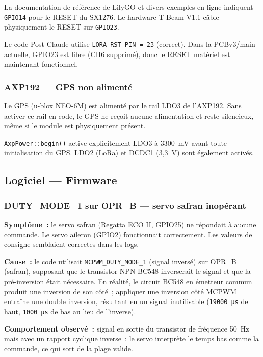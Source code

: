 \documentclass[12pt,a4paper]{article}
\newcommand{\gpio}[1]{\texttt{GPIO#1}}
\newcommand{\us}[1]{\texttt{#1\,µs}}
\begin{document}
\begin{warningbox}
  La documentation de référence de LilyGO et divers exemples en ligne
  indiquent \gpio{14} pour le RESET du SX1276. Le hardware T-Beam V1.1
  câble physiquement le RESET sur \gpio{23}.
\end{warningbox}

\begin{okbox}
  Le code Post-Claude utilise \texttt{LORA\_RST\_PIN = 23} (correct).
  Dans la PCBv3/main actuelle, GPIO23 est libre (CH6 supprimé), donc le
  RESET matériel est maintenant fonctionnel.
\end{okbox}

\subsubsection{AXP192 — GPS non alimenté}

\begin{warningbox}
  Le GPS (u-blox NEO-6M) est alimenté par le rail LDO3 de l'AXP192.
  Sans activer ce rail en code, le GPS ne reçoit aucune alimentation et
  reste silencieux, même si le module est physiquement présent.
\end{warningbox}

\begin{okbox}
  \texttt{AxpPower::begin()} active explicitement LDO3 à 3300~mV avant
  toute initialisation du GPS. LDO2 (LoRa) et DCDC1 (3,3~V) sont
  également activés.
\end{okbox}

\subsection{Logiciel — Firmware}

\subsubsection{DUTY\_MODE\_1 sur OPR\_B — servo safran inopérant}

\begin{warningbox}
  \textbf{Symptôme~:} le servo safran (Regatta ECO II, GPIO25) ne répondait
  à aucune commande. Le servo aileron (GPIO2) fonctionnait correctement.
  Les valeurs de consigne semblaient correctes dans les logs.

  \textbf{Cause~:} le code utilisait \texttt{MCPWM\_DUTY\_MODE\_1} (signal
  inversé) sur OPR\_B (safran), supposant que le transistor NPN BC548
  inverserait le signal et que la pré-inversion était nécessaire.
  En réalité, le circuit BC548 en émetteur commun produit une inversion
  de son côté~; appliquer une inversion côté MCPWM entraîne une double
  inversion, résultant en un signal inutilisable (\us{19000} de haut,
  \us{1000} de bas au lieu de l'inverse).

  \textbf{Comportement observé~:} signal en sortie du transistor de
  fréquence 50~Hz mais avec un rapport cyclique inverse~: le servo interprète
  le temps bas comme la commande, ce qui sort de la plage valide.
\end{warningbox}
\end{document}
